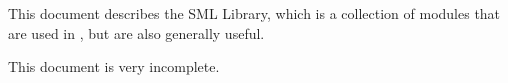 This document describes the {\mlton} SML Library, which is a collection of
modules that are used in {\mlton}, but are also generally useful.

This document is very incomplete.
